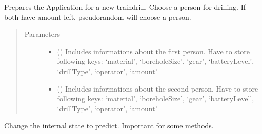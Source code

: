 \documentclass[letterpaper,10pt,english]{sphinxmanual}
\begin{document}
\begin{fulllineitems}
\begin{fulllineitems}
\end{fulllineitems}


\begin{fulllineitems}
\label{\detokenize{anoog.automation:anoog.automation.controller.Terminal.init_train_drilling}}
\sphinxAtStartPar
Prepares the Application for a new train\sphinxhyphen{}drill.
Choose a person for drilling. If both have amount left, pseudo\sphinxhyphen{}random will choose a person.
\begin{quote}\begin{description}
\item[{Parameters}] \leavevmode\begin{itemize}
\item {} 
\sphinxAtStartPar
{} () \textendash{} Includes informations about the first person. Have to store following keys: ‘material’, ‘boreholeSize’, ‘gear’, ‘batteryLevel’, ‘drillType’, ‘operator’, ‘amount’

\item {} 
\sphinxAtStartPar
{} () \textendash{} Includes informations about the second person. Have to store following keys: ‘material’, ‘boreholeSize’, ‘gear’, ‘batteryLevel’, ‘drillType’, ‘operator’, ‘amount’

\end{itemize}

\end{description}\end{quote}

\end{fulllineitems}


\begin{fulllineitems}
\label{\detokenize{anoog.automation:anoog.automation.controller.Terminal.load_predict}}
\sphinxAtStartPar
Change the internal state to predict. Important for some methods.


\end{fulllineitems}
\end{fulllineitems}
\end{document}
